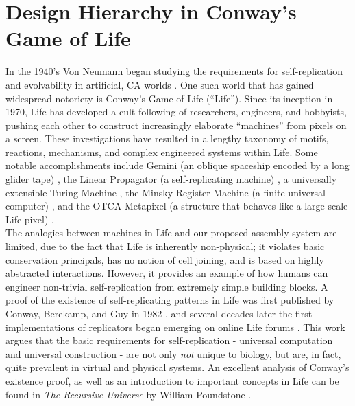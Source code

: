 {%
\section{Design Hierarchy in Conway's Game of Life}\label{sec:conwayHierarchy}

In the 1940's Von Neumann began studying the requirements for self-replication and evolvability in artificial, CA worlds  \cite{Neumann1966}.  One such world that has gained widespread notoriety is Conway's Game of Life (``Life'').  Since its inception in 1970, Life has developed a cult following of researchers, engineers, and hobbyists, pushing each other to construct increasingly elaborate ``machines'' from pixels on a screen.  These investigations have resulted in a lengthy taxonomy of motifs, reactions, mechanisms, and complex engineered systems within Life.  Some notable accomplishments include Gemini (an oblique spaceship encoded by a long glider tape) \cite{Wade2010}, the Linear Propagator (a self-replicating machine) \cite{Greene2013}, a universally extensible Turing Machine  \cite{Rendell2000}, the Minsky Register Machine (a finite universal computer) \cite{Chapman2002}, and the OTCA Metapixel (a structure that behaves like a large-scale Life pixel) \cite{Due2006}.\\

The analogies between machines in Life and our proposed assembly system are limited, due to the fact that Life is inherently non-physical; it violates basic conservation principals, has no notion of cell joining, and is based on highly abstracted interactions.  However, it provides an example of how humans can engineer non-trivial self-replication from extremely simple building blocks.  A proof of the existence of self-replicating patterns in Life was first published by Conway, Berekamp, and Guy in 1982 \cite{Berekamp1982}, and several decades later the first implementations of replicators began emerging on online Life forums \cite{Greene2013a}.  This work argues that the basic requirements for self-replication - universal computation and universal construction - are not only \textit{not} unique to biology, but are, in fact, quite prevalent in virtual and physical systems.  An excellent analysis of Conway's existence proof, as well as an introduction to important concepts in Life can be found in \textit{The Recursive Universe} by William Poundstone \cite{Poundstone1985}.\\

}
